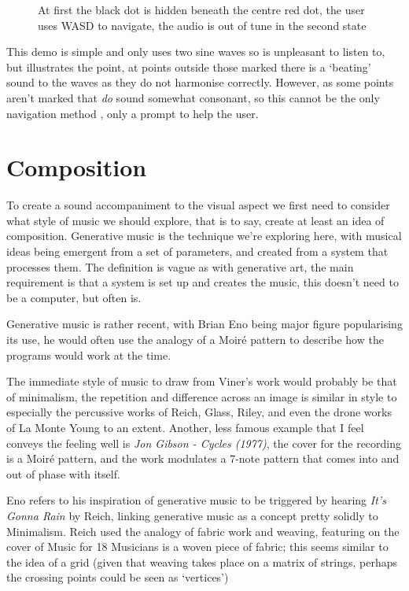 \begin{figure}[H]
\centering
{}%
\hspace*{2cm}%
\caption{At first the black dot is hidden beneath the centre red dot, the user uses WASD to navigate,
the audio is out of tune in the second state}
\end{figure}

This demo is simple and only uses two sine waves so is unpleasant to listen to,
but illustrates the point, at points outside those marked there is a `beating'
sound to the waves as they do not harmonise correctly. However, as some points
aren't marked that \emph{do} sound somewhat consonant, so this cannot be the
only navigation method , only a prompt to help the user.
\section{Composition}
\label{Composition}
To create a sound accompaniment to the visual aspect we first need to consider
what style of music we should explore, that is to say, create at least an idea
of composition. Generative music is the technique we're exploring here, with
musical ideas being emergent from a set of parameters, and created from a system
that processes them. The definition is vague as with generative art, the main
requirement is that a system is set up and creates the music, this doesn't need
to be a computer, but often is.

Generative music is rather recent, with Brian Eno being major figure
popularising its use, he would often use the analogy of a Moir\'{e} pattern to
describe how the programs would work at the time.  

The immediate style of music to draw from Viner's work would probably be that of
minimalism, the repetition and difference across an image is similar in style to
especially the percussive works of Reich, Glass, Riley, and even the drone works
of La Monte Young to an extent. Another, less famous example that I feel conveys
the feeling well is \emph{Jon Gibson - Cycles (1977)}, the cover for the
recording is a Moir\'{e} pattern, and the work modulates a 7-note pattern that
comes into and out of phase with itself.

Eno refers to his inspiration of generative music to be triggered by
hearing \emph{It's Gonna Rain} by Reich, linking generative music as a concept
pretty solidly to Minimalism. Reich used the analogy of fabric work and weaving,
featuring on the cover of Music for 18 Musicians is a woven piece of fabric;
this seems similar to the idea of a grid (given that weaving takes place on a
matrix of strings, perhaps the crossing points could be seen as `vertices')

